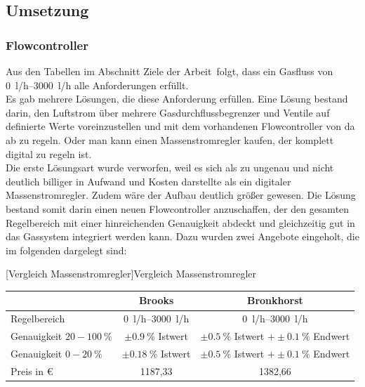 \subsection{Umsetzung}

\subsubsection{Flowcontroller}

Aus den Tabellen im Abschnitt \glqq Ziele der Arbeit\grqq \ folgt, dass ein Gasfluss von \SIrange{0}{3000}{l/h} alle Anforderungen erfüllt. \\
Es gab mehrere Lösungen, die diese Anforderung erfüllen. Eine Lösung bestand darin, den Luftstrom über mehrere Gasdurchflussbegrenzer und Ventile auf definierte Werte voreinzustellen und mit dem vorhandenen Flowcontroller von da ab zu regeln. Oder man kann einen Massenstromregler kaufen, der komplett digital zu regeln ist. \\
Die erste Lösungsart wurde verworfen, weil es sich als zu ungenau und nicht deutlich billiger in Aufwand und Kosten darstellte als ein digitaler Massenstromregler. Zudem wäre der Aufbau deutlich größer gewesen. Die Lösung bestand somit darin einen neuen Flowcontroller anzuschaffen, der den gesamten Regelbereich mit einer hinreichenden Genauigkeit abdeckt und gleichzeitig gut in das Gassystem integriert werden kann. Dazu wurden zwei Angebote eingeholt, die im folgenden dargelegt sind:

\begin{center}
	[Vergleich Massenstromregler]{Vergleich Massenstromregler}
	\vspace{0.25cm}
	\begin{tabular}{l|c|c}
		& Brooks & Bronkhorst \\ 
		\hline Regelbereich & \SIrange{0}{3000}{l/h} & \SIrange{0}{3000}{l/h} \\ 
		\hline Genauigkeit $20 - \SI{100}{\%}$ & $\pm \SI{0,9}{\%}$ Istwert & $\pm \SI{0,5}{\%}$ Istwert $+ \pm \SI{0,1}{\%}$ Endwert\\ 
		\hline Genauigkeit $0 - \SI{20}{\%}$ & $\pm \SI{0,18}{\%}$ Istwert & $\pm \SI{0,5}{\%}$ Istwert $+ \pm \SI{0,1}{\%}$ Endwert \\ 
		\hline Preis in \euro & 1187,33 & 1382,66 \\ 
	\end{tabular} 
\end{center}


\vspace{0,5cm}

